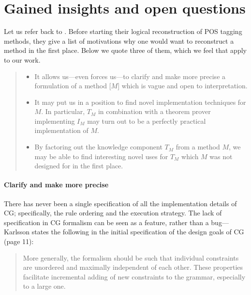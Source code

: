 \section{Gained insights and open questions}

Let us refer back to \cite{lager_nivre01}. 
Before starting their logical reconstruction of POS tagging methods, 
they give a list of motivations why one would want to reconstruct a method in the first place.
Below we quote three of them, which we feel that apply to our work.

\begin{quote}
\begin{itemize}
\item It allows us---even forces us---to clarify and make more precise a formulation of a method [$M$] which is vague and open to interpretation.
\item It may put us in a position to find novel implementation techniques for $M$. 
In particular, $T_M$ in combination with a theorem prover implementing $I_M$ may turn out to be a perfectly practical implementation of $M$.
\item By factoring out the knowledge component $T_M$ from a method $M$, 
we may be able to find interesting novel uses for $T_M$ which $M$ was not designed for in the first place.
\end{itemize}
\end{quote}


\paragraph{Clarify and make more precise} %

There has never been a single specification of all the implementation details of CG; specifically, the rule ordering and the execution strategy.
The lack of specification in CG formalism can be seen as a feature, rather than a bug---Karlsson states the following in the initial specification of the design goals of CG \cite{karlsson1995constraint} (page 11):

\begin{quote}
More generally, the formalism should be such that individual constraints are unordered and maximally independent of each other. These properties facilitate incremental adding of new constraints to the grammar, especially to a large one.
\end{quote}

